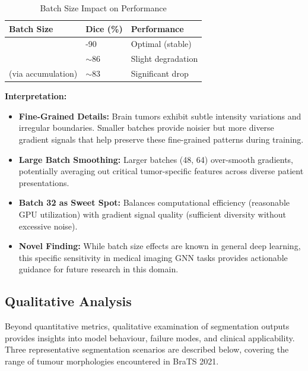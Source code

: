 \begin{table}[htbp]
\caption{Batch Size Impact on Performance}
\begin{center}
\begin{tabularx}{0.75\textwidth} { 
  | >{\centering\arraybackslash}X 
  | >{\centering\arraybackslash}X 
  | >{\centering\arraybackslash}X 
  | }
\hline
\textbf{Batch Size} & \textbf{Dice (\%)} & \textbf{Performance}\\
\hline
32 & 84-90 & Optimal (stable)\\
\hline
48 & $\sim$86 & Slight degradation\\
\hline
64 (via accumulation) & $\sim$83 & Significant drop\\
\hline
\end{tabularx}
\label{tab:batch_size}
\end{center}
\end{table}

\textbf{Interpretation:}
\begin{itemize}
    \item \textbf{Fine-Grained Details:} Brain tumors exhibit subtle intensity variations and irregular boundaries. Smaller batches provide noisier but more diverse gradient signals that help preserve these fine-grained patterns during training.
    
    \item \textbf{Large Batch Smoothing:} Larger batches (48, 64) over-smooth gradients, potentially averaging out critical tumor-specific features across diverse patient presentations.
    
    \item \textbf{Batch 32 as Sweet Spot:} Balances computational efficiency (reasonable GPU utilization) with gradient signal quality (sufficient diversity without excessive noise).
    
    \item \textbf{Novel Finding:} While batch size effects are known in general deep learning, this specific sensitivity in medical imaging GNN tasks provides actionable guidance for future research in this domain.
\end{itemize}


\subsection{Qualitative Analysis}

Beyond quantitative metrics, qualitative examination of segmentation outputs provides insights into model behaviour, failure modes, and clinical applicability. Three representative segmentation scenarios are described below, covering the range of tumour morphologies encountered in BraTS 2021.

